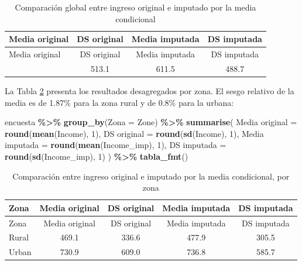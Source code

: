 \documentclass[
  spanish,
  12pt,
]{book}
\newenvironment{Shaded}{\begin{snugshade}}{\end{snugshade}}
\newcommand{\AttributeTok}[1]{\textcolor[rgb]{0.13,0.29,0.53}{#1}}
\newcommand{\DecValTok}[1]{\textcolor[rgb]{0.00,0.00,0.81}{#1}}
\newcommand{\FunctionTok}[1]{\textcolor[rgb]{0.13,0.29,0.53}{\textbf{#1}}}
\newcommand{\NormalTok}[1]{#1}
\newcommand{\OtherTok}[1]{\textcolor[rgb]{0.56,0.35,0.01}{#1}}
\newcommand{\SpecialCharTok}[1]{\textcolor[rgb]{0.81,0.36,0.00}{\textbf{#1}}}
\newcommand{\StringTok}[1]{\textcolor[rgb]{0.31,0.60,0.02}{#1}}
\begin{document}
\begin{longtable}[]{@{}lccc@{}}
\caption{\label{tab:tab-sesgo-media-cond-global}Comparación global entre ingreso original e imputado por la media condicional}\tabularnewline
\toprule\noalign{}
Media original & DS original & Media imputada & DS imputada \\
\midrule\noalign{}
\endfirsthead
\toprule\noalign{}
Media original & DS original & Media imputada & DS imputada \\
\midrule\noalign{}
\endhead
\bottomrule\noalign{}
\endlastfoot
604.2 & 513.1 & 611.5 & 488.7 \\
\end{longtable}

La Tabla \ref{tab:tab-sesgo-media-cond-zona} presenta los resultados desagregados por zona. El sesgo relativo de la media es de 1.87\% para la zona rural y de 0.8\% para la urbana:

\begin{Shaded}
\begin{Highlighting}[]
\NormalTok{encuesta }\SpecialCharTok{\%\textgreater{}\%}
  \FunctionTok{group\_by}\NormalTok{(}\AttributeTok{Zona =}\NormalTok{ Zone) }\SpecialCharTok{\%\textgreater{}\%}
  \FunctionTok{summarise}\NormalTok{(}
    \StringTok{\textasciigrave{}}\AttributeTok{Media original}\StringTok{\textasciigrave{}}  \OtherTok{=} \FunctionTok{round}\NormalTok{(}\FunctionTok{mean}\NormalTok{(Income), }\DecValTok{1}\NormalTok{),}
    \StringTok{\textasciigrave{}}\AttributeTok{DS original}\StringTok{\textasciigrave{}}     \OtherTok{=} \FunctionTok{round}\NormalTok{(}\FunctionTok{sd}\NormalTok{(Income), }\DecValTok{1}\NormalTok{),}
    \StringTok{\textasciigrave{}}\AttributeTok{Media imputada}\StringTok{\textasciigrave{}}  \OtherTok{=} \FunctionTok{round}\NormalTok{(}\FunctionTok{mean}\NormalTok{(Income\_imp), }\DecValTok{1}\NormalTok{),}
    \StringTok{\textasciigrave{}}\AttributeTok{DS imputada}\StringTok{\textasciigrave{}}     \OtherTok{=} \FunctionTok{round}\NormalTok{(}\FunctionTok{sd}\NormalTok{(Income\_imp), }\DecValTok{1}\NormalTok{)}
\NormalTok{  ) }\SpecialCharTok{\%\textgreater{}\%} \FunctionTok{tabla\_fmt}\NormalTok{()}
\end{Highlighting}
\end{Shaded}

\begin{longtable}[]{@{}lcccc@{}}
\caption{\label{tab:tab-sesgo-media-cond-zona}Comparación entre ingreso original e imputado por la media condicional, por zona}\tabularnewline
\toprule\noalign{}
Zona & Media original & DS original & Media imputada & DS imputada \\
\midrule\noalign{}
\endfirsthead
\toprule\noalign{}
Zona & Media original & DS original & Media imputada & DS imputada \\
\midrule\noalign{}
\endhead
\bottomrule\noalign{}
\endlastfoot
Rural & 469.1 & 336.6 & 477.9 & 305.5 \\
Urban & 730.9 & 609.0 & 736.8 & 585.7 \\
\end{longtable}
\end{document}
